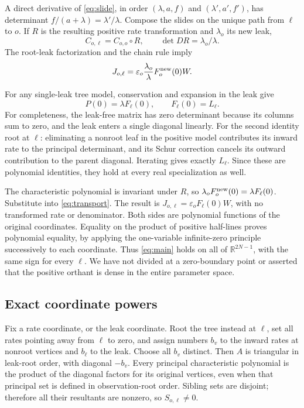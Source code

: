\documentclass[11pt]{article}
\theoremstyle{remark}
\newcommand{\R}{\mathbb R}
\newcommand{\1}{\mathbf 1}
\begin{document}
A direct derivative of \eqref{eq:slide}, in order $(\lambda,a,f)$ and
$(\lambda',a',f')$, has determinant $f/(a+\lambda)=\lambda'/\lambda$.
Compose the slides on the unique path from $\ell$ to $o$. If $R$ is the
resulting positive rate transformation and $\lambda_o$ its new leak,
\[
 C_{o,\ell}=C_{o,o}\circ R,\qquad
 \det DR=\lambda_o/\lambda.
\]
The root-leak factorization and the chain rule imply
\begin{equation}\label{eq:transport}
 J_{o,\ell}=\varepsilon_o\frac{\lambda_o}{\lambda}F_o^{\rm new}(0)W.
\end{equation}

For any single-leak tree model, conservation and expansion in the leak give
\begin{equation}\label{eq:cofactorzero}
 P(0)=\lambda F_\ell(0),\qquad F_\ell(0)=L_\ell.
\end{equation}
For completeness, the leak-free matrix has zero determinant because its
columns sum to zero, and the leak enters a single diagonal linearly.
For the second identity root at $\ell$: eliminating a nonroot leaf in the
positive model contributes its inward rate to the principal determinant,
and its Schur correction cancels its outward contribution to the parent
diagonal. Iterating gives exactly $L_\ell$. Since these are polynomial
identities, they hold at every real specialization as well.

The characteristic polynomial is invariant under $R$, so
$\lambda_oF_o^{\rm new}(0)=\lambda F_\ell(0)$.
Substitute into \eqref{eq:transport}. The result is
$J_{o,\ell}=\varepsilon_oF_\ell(0)W$, with no transformed rate or denominator.
Both sides are polynomial functions of the original coordinates. Equality
on the product of positive half-lines proves polynomial equality, by applying
the one-variable infinite-zero principle successively to each coordinate.
Thus \eqref{eq:main} holds on all of $\R^{2N-1}$, with the same sign for
every $\ell$. We have not divided at a zero-boundary point or asserted that
the positive orthant is dense in the entire parameter space.

\subsection{Exact coordinate powers}
Fix a rate coordinate, or the leak coordinate. Root the tree instead at
$\ell$, set all rates pointing away from $\ell$ to zero, and assign numbers
$b_v$ to the inward rates at nonroot vertices and $b_\ell$ to the leak.
Choose all $b_v$ distinct. Then $A$ is triangular in leak-root order, with
diagonal $-b_v$. Every principal characteristic polynomial is the product
of the diagonal factors for its original vertices, even when that principal
set is defined in observation-root order. Sibling sets are disjoint;
therefore all their resultants are nonzero, so $S_{o,\ell}\ne0$.
\end{document}
